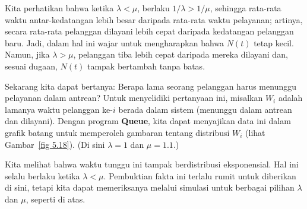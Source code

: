 \begin{example}
Kita perhatikan bahwa ketika $\lambda < \mu$, berlaku $1/\lambda > 1/\mu$, sehingga rata-rata waktu
antar-kedatangan lebih besar daripada rata-rata waktu pelayanan; artinya, secara rata-rata pelanggan
dilayani lebih cepat daripada kedatangan pelanggan baru.  Jadi, dalam hal ini wajar untuk mengharapkan
bahwa $N(t)$ tetap kecil.  Namun, jika $\lambda > \mu$, pelanggan tiba lebih cepat daripada mereka
dilayani dan, sesuai dugaan, $N(t)$ tampak bertambah tanpa batas.
\par
Sekarang kita dapat bertanya: Berapa lama seorang pelanggan harus menunggu pelayanan dalam antrean?
Untuk menyelidiki pertanyaan ini, misalkan $W_i$ adalah lamanya waktu pelanggan ke-$i$ berada dalam
sistem (menunggu dalam antrean dan dilayani).  Dengan program {\bf Queue}, kita dapat menyajikan data
ini dalam grafik batang untuk memperoleh gambaran tentang distribusi $W_i$ (lihat
Gambar~\ref{fig 5.18}). (Di sini $\lambda = 1$ dan $\mu = 1.1$.)
\par
Kita melihat bahwa waktu tunggu ini tampak berdistribusi eksponensial.  Hal ini selalu berlaku
ketika $\lambda < \mu$.  Pembuktian fakta ini terlalu rumit untuk diberikan di sini, tetapi kita
dapat memeriksanya melalui simulasi untuk berbagai pilihan $\lambda$ dan $\mu$, seperti di atas.
\end{example}

